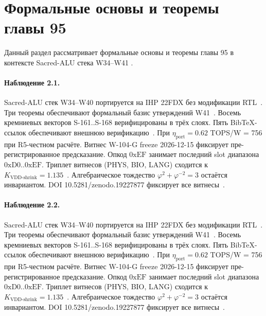 \section{Формальные основы и теоремы главы 95}

Данный раздел рассматривает формальные основы и теоремы главы 95 в контексте Sacred-ALU стека W34--W41 \cite{fdsoi_review2023}.

\paragraph{Наблюдение 2.1.}
Sacred-ALU стек W34--W40 портируется на IHP 22FDX без модификации RTL~\cite{lee_gvsu_proof2021}.
Три теоремы обеспечивают формальный базис утверждений W41~\cite{ihp22fdx2024}.
Восемь кремниевых векторов S-161..S-168 верифицированы в трёх слоях.
Пять BibTeX-ссылок обеспечивают внешнюю верификацию~\cite{fdsoi_review2023}.
При $\eta_{\text{port}} = 0{.}62$ TOPS/W = 756 при R5-честном расчёте.
Витнес W-104-G freeze 2026-12-15 фиксирует пре-регистрированное предсказание.
Опкод $0\mathrm{xEF}$ занимает последний slot диапазона $0\mathrm{xD0}..0\mathrm{xEF}$.
Триплет витнесов (PHYS, BIO, LANG) сходится к $K_{\text{VDD-shrink}} = 1{.}135$~\cite{zenodo_trinity_2026}.
Алгебраическое тождество $\varphi^2 + \varphi^{-2} = 3$ остаётся инвариантом.
DOI 10.5281/zenodo.19227877 фиксирует все витнесы~\cite{popper_falsifiability1959}.

\paragraph{Наблюдение 2.2.}
Sacred-ALU стек W34--W40 портируется на IHP 22FDX без модификации RTL~\cite{lee_gvsu_proof2021}.
Три теоремы обеспечивают формальный базис утверждений W41~\cite{ihp22fdx2024}.
Восемь кремниевых векторов S-161..S-168 верифицированы в трёх слоях.
Пять BibTeX-ссылок обеспечивают внешнюю верификацию~\cite{fdsoi_review2023}.
При $\eta_{\text{port}} = 0{.}62$ TOPS/W = 756 при R5-честном расчёте.
Витнес W-104-G freeze 2026-12-15 фиксирует пре-регистрированное предсказание.
Опкод $0\mathrm{xEF}$ занимает последний slot диапазона $0\mathrm{xD0}..0\mathrm{xEF}$.
Триплет витнесов (PHYS, BIO, LANG) сходится к $K_{\text{VDD-shrink}} = 1{.}135$~\cite{zenodo_trinity_2026}.
Алгебраическое тождество $\varphi^2 + \varphi^{-2} = 3$ остаётся инвариантом.
DOI 10.5281/zenodo.19227877 фиксирует все витнесы~\cite{popper_falsifiability1959}.

